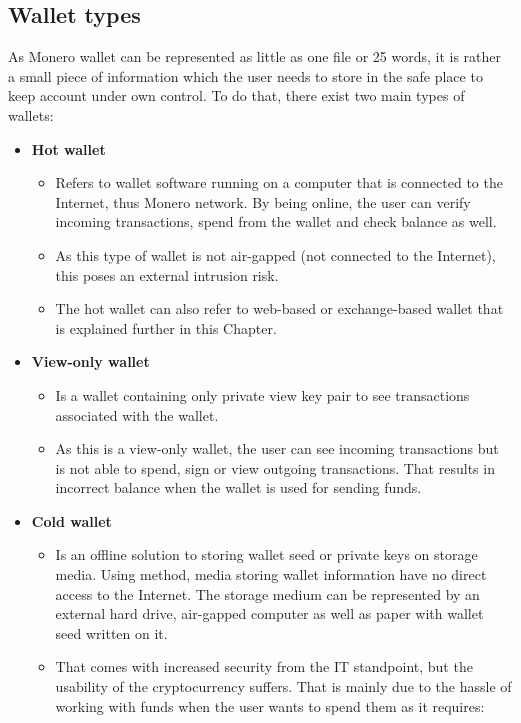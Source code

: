 \documentclass[
  printed, %
  table,   %
  lof,     %
  lot,     %
           oneside, color
]{fithesis3}
\begin{document}
\subsection{Wallet types}
\label{sec:wallettypes}
As Monero wallet can be represented as little as one file or 25 words, it is rather a small piece of information which the user needs to store in the safe place to keep account under own control. To do that, there exist two main types of wallets:
\begin{itemize}\itemsep0em
\item \textbf{Hot wallet}
\begin{itemize}\itemsep0em
\item Refers to wallet software running on a computer that is connected to the Internet, thus Monero network. By being online, the user can verify incoming transactions, spend from the wallet and check balance as well.
\item As this type of wallet is not air-gapped (not connected to the Internet), this poses an external intrusion risk.
\item The hot wallet can also refer to web-based or exchange-based wallet that is explained further in this Chapter.
\end{itemize}
\item \textbf{View-only wallet}
\begin{itemize}\itemsep0em
\item Is a wallet containing only private view key pair to see transactions associated with the wallet.
\item As this is a view-only wallet, the user can see incoming transactions but is not able to spend, sign or view outgoing transactions. That results in incorrect balance when the wallet is used for sending funds.
\end{itemize}
\item \textbf{Cold wallet}
\begin{itemize}\itemsep0em
\item Is an offline solution to storing wallet seed or private keys on storage media. Using method, media storing wallet information have no direct access to the Internet. The storage medium can be represented by an external hard drive, air-gapped computer as well as paper with wallet seed written on it.
\item That comes with increased security from the IT standpoint, but the usability of the cryptocurrency suffers. That is mainly due to the hassle of working with funds when the user wants to spend them as it requires:

\end{itemize}
\end{itemize}
\end{document}
